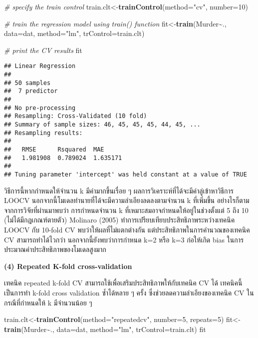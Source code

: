\documentclass[
]{article}
\newenvironment{Shaded}{\begin{snugshade}}{\end{snugshade}}
\newcommand{\CommentTok}[1]{\textcolor[rgb]{0.56,0.35,0.01}{\textit{#1}}}
\newcommand{\DataTypeTok}[1]{\textcolor[rgb]{0.13,0.29,0.53}{#1}}
\newcommand{\DecValTok}[1]{\textcolor[rgb]{0.00,0.00,0.81}{#1}}
\newcommand{\KeywordTok}[1]{\textcolor[rgb]{0.13,0.29,0.53}{\textbf{#1}}}
\newcommand{\NormalTok}[1]{#1}
\newcommand{\OperatorTok}[1]{\textcolor[rgb]{0.81,0.36,0.00}{\textbf{#1}}}
\newcommand{\StringTok}[1]{\textcolor[rgb]{0.31,0.60,0.02}{#1}}
\begin{document}
\begin{Shaded}
\begin{Highlighting}[]
\CommentTok{\# specify the train control}
\NormalTok{train.clt\textless{}{-}}\KeywordTok{trainControl}\NormalTok{(}\DataTypeTok{method=}\StringTok{"cv"}\NormalTok{, }\DataTypeTok{number=}\DecValTok{10}\NormalTok{)}

\CommentTok{\# train the regression model using train() function}
\NormalTok{fit\textless{}{-}}\KeywordTok{train}\NormalTok{(Murder}\OperatorTok{\textasciitilde{}}\NormalTok{., }\DataTypeTok{data=}\NormalTok{dat, }\DataTypeTok{method=}\StringTok{"lm"}\NormalTok{, }\DataTypeTok{trControl=}\NormalTok{train.clt)}

\CommentTok{\# print the CV results}
\NormalTok{fit}
\end{Highlighting}
\end{Shaded}

\begin{verbatim}
## Linear Regression 
## 
## 50 samples
##  7 predictor
## 
## No pre-processing
## Resampling: Cross-Validated (10 fold) 
## Summary of sample sizes: 46, 45, 45, 45, 44, 45, ... 
## Resampling results:
## 
##   RMSE      Rsquared  MAE     
##   1.981908  0.789024  1.635171
## 
## Tuning parameter 'intercept' was held constant at a value of TRUE
\end{verbatim}

วิธีการนี้หากกำหนดให้จำนวน k มีค่ามากขึ้นเรื่อย ๆ
ผลการวิเคราะห์ที่ได้จะมีค่าลู่เข้าหาวิธีการ LOOCV
นอกจากนี้โมเดลทำนายที่ได้จะมีความลำเอียงลดลงตามจำนวน k ที่เพิ่มขึ้น
อย่างไรก็ตามจากการวิจัยที่ผ่านมาพบว่า การกำหนดจำนวน k
ที่เหมาะสมอาจกำหนดให้อยู่ในช่วงตั้งแต่ 5 ถึง 10 (ไม่ได้มีกฎเกณฑ์ตายตัว)
Molinaro (2005) ทำการเปรียบเทียบประสิทธิภาพระหว่างเทคนิค LOOCV กับ
10-fold CV พบว่าให้ผลที่ไม่แตกต่างกัน แต่ประสิทธิภาพในการคำนวณของเทคนิค
CV สามารถทำได้ไวกว่า นอกจากนี้ยังพบว่าการกำหนด k=2 หรือ k=3 ก่อให้เกิด
bias ในการประมาณค่าประสิทธิภาพของโมเดลสูงมาก

\textbf{(4) Repeated K-fold cross-validation}

เทคนิค repeated k-fold CV สามารถใช้เพื่อเสริมประสิทธิภาพให้กับเทคนิค CV
ได้ เทคนิคนี้เป็นการทำ k-fold cross validation ซ้ำได้หลาย ๆ ครั้ง
ซึ่งช่วยลดความลำเอียงของเทคนิค CV ในกรณีที่กำหนดให้ k มีจำนวนน้อย ๆ

\begin{Shaded}
\begin{Highlighting}[]
\NormalTok{train.clt\textless{}{-}}\KeywordTok{trainControl}\NormalTok{(}\DataTypeTok{method=}\StringTok{"repeatedcv"}\NormalTok{, }\DataTypeTok{number=}\DecValTok{5}\NormalTok{, }\DataTypeTok{repeats=}\DecValTok{5}\NormalTok{)}
\NormalTok{fit\textless{}{-}}\KeywordTok{train}\NormalTok{(Murder}\OperatorTok{\textasciitilde{}}\NormalTok{., }\DataTypeTok{data=}\NormalTok{dat, }\DataTypeTok{method=}\StringTok{"lm"}\NormalTok{, }\DataTypeTok{trControl=}\NormalTok{train.clt)}
\NormalTok{fit}
\end{Highlighting}
\end{Shaded}
\end{document}
